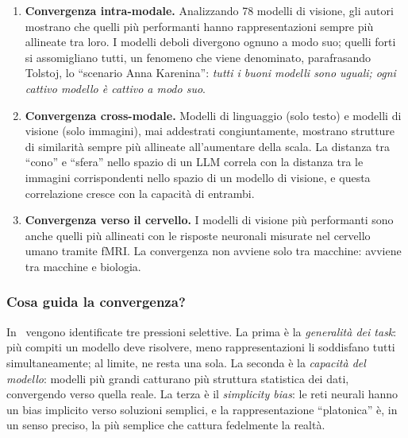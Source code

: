 \begin{enumerate}
    \item \textbf{Convergenza intra-modale.} Analizzando 78 modelli di visione, gli autori mostrano che quelli più performanti hanno rappresentazioni sempre più allineate tra loro. I modelli deboli divergono ognuno a modo suo; quelli forti si assomigliano tutti, un fenomeno che viene denominato, parafrasando Tolstoj, lo ``scenario Anna Karenina'': \textit{tutti i buoni modelli sono uguali; ogni cattivo modello è cattivo a modo suo}.
    \item \textbf{Convergenza cross-modale.} Modelli di linguaggio (solo testo) e modelli di visione (solo immagini), mai addestrati congiuntamente, mostrano strutture di similarità sempre più allineate all'aumentare della scala. La distanza tra ``cono'' e ``sfera'' nello spazio di un LLM correla con la distanza tra le immagini corrispondenti nello spazio di un modello di visione, e questa correlazione cresce con la capacità di entrambi.
    \item \textbf{Convergenza verso il cervello.} I modelli di visione più performanti sono anche quelli più allineati con le risposte neuronali misurate nel cervello umano tramite fMRI. La convergenza non avviene solo tra macchine: avviene tra macchine e biologia.
\end{enumerate}

\subsubsection{Cosa guida la convergenza?}
\label{subsubsec:guida_convergenza}
In~\parencite{huh2024platonic} vengono identificate tre pressioni selettive. La prima è la \textit{generalità dei task}: più compiti un modello deve risolvere, meno rappresentazioni li soddisfano tutti simultaneamente; al limite, ne resta una sola. La seconda è la \textit{capacità del modello}: modelli più grandi catturano più struttura statistica dei dati, convergendo verso quella reale. La terza è il \textit{simplicity bias}: le reti neurali hanno un bias implicito verso soluzioni semplici, e la rappresentazione ``platonica'' è, in un senso preciso, la più semplice che cattura fedelmente la realtà.
